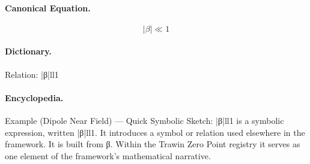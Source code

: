 \paragraph{Canonical Equation.}
\[
|\beta|\ll1
\]

\paragraph{Dictionary.}
Relation: |β|ll1

\paragraph{Encyclopedia.}
Example (Dipole Near Field) — Quick Symbolic Sketch: |β|ll1 is a symbolic expression, written |β|ll1. It introduces a symbol or relation used elsewhere in the framework. It is built from β. Within the Trawin Zero Point registry it serves as one element of the framework's mathematical narrative.
